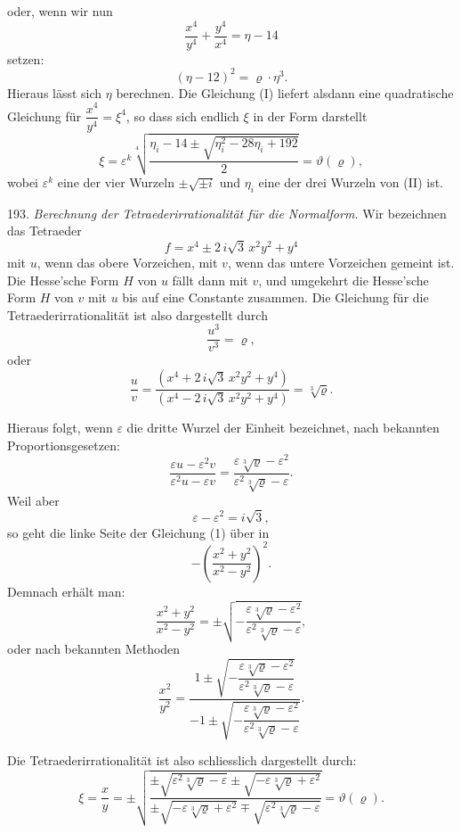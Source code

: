 \documentclass[11pt]{article}
\providecommand{\weberpage}[1]{}
\providecommand{\weq}[2]{\begin{equation}\tag{#1}#2\end{equation}}
\begin{document}
\weberpage{215}
oder, wenn wir nun
\weq{I}{\frac{x^4}{y^4}+\frac{y^4}{x^4}=\eta-14}
setzen:
\weq{II}{(\eta-12)^2=\varrho\cdot\eta^3.}
Hieraus lässt sich $\eta$ berechnen. Die Gleichung (I) liefert alsdann eine quadratische Gleichung für $\dfrac{x^4}{y^4}=\xi^4$, so dass sich endlich $\xi$ in der Form darstellt
\weq{III}{\xi=\varepsilon^k\sqrt[4]{\frac{\eta_i-14\pm\sqrt{\eta_i^{2}-28\eta_i+192}}{2}}=\vartheta(\varrho),}
wobei $\varepsilon^k$ eine der vier Wurzeln $\pm\sqrt{\pm i}$ und $\eta_i$ eine der drei Wurzeln von (II) ist.

193. \textit{Berechnung der Tetraederirrationalität für die Normalform.} Wir bezeichnen das Tetraeder
\[
f=x^4\pm 2\,i\sqrt{3}\,x^2y^2+y^4
\]
mit $u$, wenn das obere Vorzeichen, mit $v$, wenn das untere Vorzeichen gemeint ist. Die Hesse'sche Form $H$ von $u$ fällt dann mit $v$, und umgekehrt die Hesse'sche Form $H$ von $v$ mit $u$ bis auf eine Constante zusammen. Die Gleichung für die Tetraederirrationalität ist also dargestellt durch
\[
\frac{u^3}{v^3}=\varrho,
\]
oder
\[
\frac{u}{v}=\frac{(x^4+2\,i\sqrt{3}\,x^2y^2+y^4)}{(x^4-2\,i\sqrt{3}\,x^2y^2+y^4)}=\sqrt[3]{\varrho}.
\]

Hieraus folgt, wenn $\varepsilon$ die dritte Wurzel der Einheit bezeichnet, nach bekannten Proportionsgesetzen:
\weq{1}{\frac{\varepsilon u-\varepsilon^2v}{\varepsilon^2u-\varepsilon v}=\frac{\varepsilon\sqrt[3]{\varrho}-\varepsilon^2}{\varepsilon^2\sqrt[3]{\varrho}-\varepsilon}.}
Weil aber
\[
\varepsilon-\varepsilon^2=i\sqrt{3},
\]
so geht die linke Seite der Gleichung (1) über in
\[
-\left(\frac{x^2+y^2}{x^2-y^2}\right)^2.
\]
Demnach erhält man:
\[
\frac{x^2+y^2}{x^2-y^2}=\pm\sqrt{-\frac{\varepsilon\sqrt[3]{\varrho}-\varepsilon^2}{\varepsilon^2\sqrt[3]{\varrho}-\varepsilon}},
\]
oder nach bekannten Methoden
\[
\frac{x^2}{y^2}=\frac{1\pm\sqrt{-\dfrac{\varepsilon\sqrt[3]{\varrho}-\varepsilon^2}{\varepsilon^2\sqrt[3]{\varrho}-\varepsilon}}}{-1\pm\sqrt{-\dfrac{\varepsilon\sqrt[3]{\varrho}-\varepsilon^2}{\varepsilon^2\sqrt[3]{\varrho}-\varepsilon}}}.
\]


\weberpage{216}
Die Tetraederirrationalität ist also schliesslich dargestellt durch:
\[
\xi=\frac{x}{y}=\pm\sqrt{\frac{\pm\sqrt{\varepsilon^2\sqrt[3]{\varrho}-\varepsilon}\pm\sqrt{-\varepsilon\sqrt[3]{\varrho}+\varepsilon^2}}{\pm\sqrt{-\varepsilon\sqrt[3]{\varrho}+\varepsilon^2}\mp\sqrt{\varepsilon^2\sqrt[3]{\varrho}-\varepsilon}}}=\vartheta(\varrho). %
\]
\end{document}
